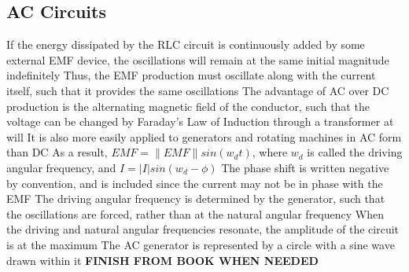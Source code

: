 \documentclass[11 pt, twoside]{article}
\newenvironment{outline*}
{
	\begin{outline}[enumerate]
	}
	{\end{outline}
}
\begin{document}
\subsection{AC Circuits}
\begin{outline*}
\1 If the energy dissipated by the RLC circuit is continuously added by some external EMF device, the oscillations will remain at the same initial magnitude indefinitely
\2 Thus, the EMF production must oscillate along with the current itself, such that it provides the same oscillations
\2 The advantage of AC over DC production is the alternating magnetic field of the conductor, such that the voltage can be changed by Faraday's Law of Induction through a transformer at will
\3 It is also more easily applied to generators and rotating machines in AC form than DC
\2 As a result, $EMF = \|EMF\|sin(w_dt)$, where $w_d$ is called the driving angular frequency, and $I = |I|sin(w_d - \phi)$
\3 The phase shift is written negative by convention, and is included since the current may not be in phase with the EMF
\3 The driving angular frequency is determined by the generator, such that the oscillations are forced, rather than at the natural angular frequency
\3 When the driving and natural angular frequencies resonate, the amplitude of the circuit is at the maximum
\2 The AC generator is represented by a circle with a sine wave drawn within it
\1 \textbf{FINISH FROM BOOK WHEN NEEDED}
\end{outline*}
\end{document}
